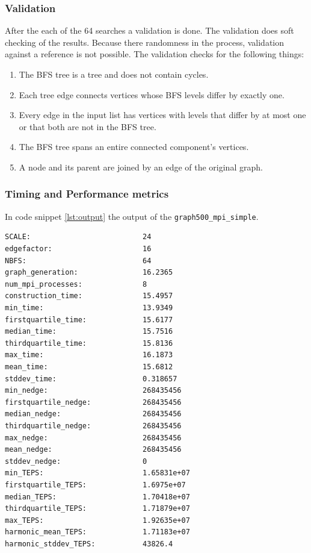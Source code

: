 \subsubsection{Validation}
After the each of the 64 searches a validation is done. The validation does soft checking of the results. Because there randomness in the process, validation against a reference is not possible. The validation checks for the following things:
\begin{enumerate}
\item The BFS tree is a tree and does not contain cycles.
\item Each tree edge connects vertices whose BFS levels differ by exactly one.
\item Every edge in the input list has vertices with levels that differ by at most one or that both are not in the BFS tree.
\item The BFS tree spans an entire connected component's vertices.
\item A node and its parent are joined by an edge of the original graph.
\end{enumerate}


\subsubsection{Timing and Performance metrics}
In code snippet \ref{lst:output} the output of the \texttt{graph500\_mpi\_simple}.
\begin{lstlisting}[label={lst:output}, caption= {Output of the benchmark.}]
SCALE:                          24
edgefactor:                     16
NBFS:                           64
graph_generation:               16.2365
num_mpi_processes:              8
construction_time:              15.4957
min_time:                       13.9349
firstquartile_time:             15.6177
median_time:                    15.7516
thirdquartile_time:             15.8136
max_time:                       16.1873
mean_time:                      15.6812
stddev_time:                    0.318657
min_nedge:                      268435456
firstquartile_nedge:            268435456
median_nedge:                   268435456
thirdquartile_nedge:            268435456
max_nedge:                      268435456
mean_nedge:                     268435456
stddev_nedge:                   0
min_TEPS:                       1.65831e+07
firstquartile_TEPS:             1.6975e+07
median_TEPS:                    1.70418e+07
thirdquartile_TEPS:             1.71879e+07
max_TEPS:                       1.92635e+07
harmonic_mean_TEPS:             1.71183e+07
harmonic_stddev_TEPS:           43826.4
\end{lstlisting}


